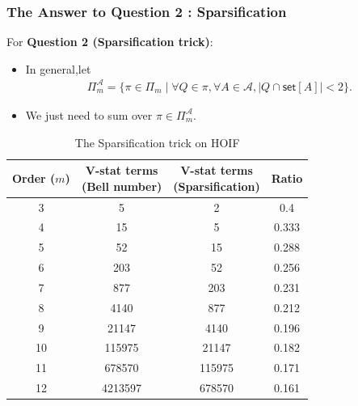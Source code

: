 \documentclass[9pt]{beamer}
\def\calA{\mathcal{A}}
\theoremstyle{mystyle}
\theoremstyle{mystyletwo}
\newcommand{\takesetp}[1]{\mathsf{set}[#1]}
\newcommand{\partition}{\Pi}
\newcommand{\partitionp}[1]{\partition_{#1}}
\begin{document}
\begin{frame}
    \frametitle{The Answer  to  Question 2 : Sparsification}
    For {\bf Question 2 (Sparsification trick)}:
    \begin{itemize}
           \item In general,let
           \begin{align*}
               \partitionp{m}^{\calA} = \{ \pi \in \partitionp{m} \mid \forall Q \in \pi, \forall A \in \calA, |Q \cap \takesetp{A}| < 2 \}.
           \end{align*}
           \item We just need to sum over $ \pi \in \partitionp{m}^{\calA}$.

    \end{itemize}
    
           \begin{table}[h!]
            \centering
            \begin{tabular}{cccc}
            \toprule
            \textbf{Order ($m$)} & \makecell{\textbf{V-stat terms} \\ \textbf{(Bell number)}} & \makecell{\textbf{V-stat terms} \\ \textbf{(Sparsification)}} & \textbf{Ratio} \\
            \midrule
            3  & 5       & 2       & 0.4 \\
            4  & 15      & 5       & 0.333 \\
            5  & 52      & 15      & 0.288 \\
            6  & 203     & 52      & 0.256 \\
            7  & 877     & 203     & 0.231 \\
            8  & 4140    & 877     & 0.212 \\
            9  & 21147   & 4140    & 0.196 \\
            10 & 115975  & 21147   & 0.182 \\
            11 & 678570  & 115975  & 0.171 \\
            12 & 4213597 & 678570  & 0.161 \\
            \bottomrule
            \end{tabular}
            \caption{The Sparsification trick on HOIF}
            \end{table}   

\end{frame}
\end{document}
